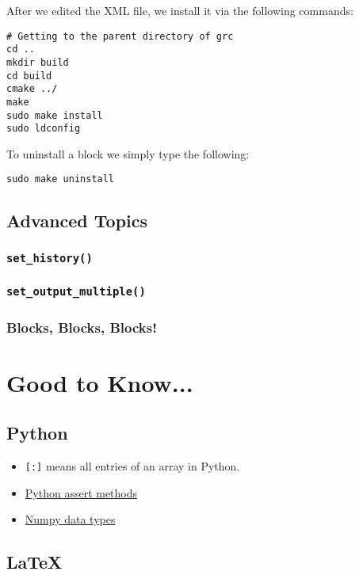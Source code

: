 \documentclass{article}
\begin{document}
After we edited the XML file, we install it via the following commands:

\begin{verbatim}
# Getting to the parent directory of grc
cd ..
mkdir build
cd build
cmake ../
make
sudo make install
sudo ldconfig
\end{verbatim}

To uninstall a block we simply type the following:
\begin{verbatim}
sudo make uninstall
\end{verbatim}

\subsection{Advanced Topics}

\subsubsection{\texttt{set\_history()}}

\subsubsection{\texttt{set\_output\_multiple()}}

\subsubsection{Blocks, Blocks, Blocks!}

\section{Good to Know...}

\subsection{Python}

\begin{itemize}
	\item \verb|[:]| means all entries of an array in Python.
	\item \href{https://docs.python.org/2/library/unittest.html#assert-methods}{Python assert methods}
	\item \href{https://docs.scipy.org/doc/numpy/user/basics.types.html}{Numpy data types}
\end{itemize}

\subsection{\LaTeX}
\end{document}
